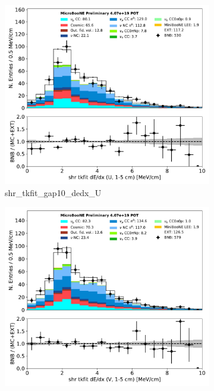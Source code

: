 \documentclass[a4paper]{article}
\begin{document}
\begin{figure}[H] 
\begin{center}
    \begin{subfigure}[b]{0.3\textwidth}
    \centering
    \includegraphics[width=1.00\textwidth]{1eNp/dataMCRun1/shr_tkfit_gap10_dedx_U01152020.pdf}
    \caption{\label{fig:1eNp:dataMCRun1:shr_tkfit_gap10_dedx_U} shr\_tkfit\_gap10\_dedx\_U }
    \end{subfigure}
    \begin{subfigure}[b]{0.3\textwidth}
    \centering
    \includegraphics[width=1.00\textwidth]{1eNp/dataMCRun1/shr_tkfit_gap10_dedx_V01152020.pdf}

\end{subfigure}
\end{center}
\end{figure}
\end{document}
